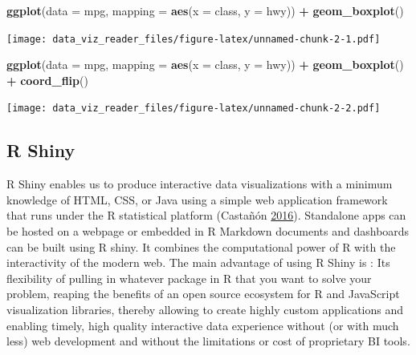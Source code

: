 \documentclass[]{book}
\newenvironment{Shaded}{\begin{snugshade}}{\end{snugshade}}
\newcommand{\DataTypeTok}[1]{\textcolor[rgb]{0.13,0.29,0.53}{#1}}
\newcommand{\KeywordTok}[1]{\textcolor[rgb]{0.13,0.29,0.53}{\textbf{#1}}}
\newcommand{\NormalTok}[1]{#1}
\newcommand{\OperatorTok}[1]{\textcolor[rgb]{0.81,0.36,0.00}{\textbf{#1}}}
\newcommand{\StringTok}[1]{\textcolor[rgb]{0.31,0.60,0.02}{#1}}
\begin{document}
\begin{Shaded}
\begin{Highlighting}[]
\KeywordTok{ggplot}\NormalTok{(}\DataTypeTok{data =}\NormalTok{ mpg, }\DataTypeTok{mapping =} \KeywordTok{aes}\NormalTok{(}\DataTypeTok{x =}\NormalTok{ class, }\DataTypeTok{y =}\NormalTok{ hwy)) }\OperatorTok{+}\StringTok{ }\KeywordTok{geom_boxplot}\NormalTok{()}
\end{Highlighting}
\end{Shaded}

\texttt{[image: data\_viz\_reader\_files/figure-latex/unnamed-chunk-2-1.pdf]}

\begin{Shaded}
\begin{Highlighting}[]
\KeywordTok{ggplot}\NormalTok{(}\DataTypeTok{data =}\NormalTok{ mpg, }\DataTypeTok{mapping =} \KeywordTok{aes}\NormalTok{(}\DataTypeTok{x =}\NormalTok{ class, }\DataTypeTok{y =}\NormalTok{ hwy)) }\OperatorTok{+}\StringTok{  }\KeywordTok{geom_boxplot}\NormalTok{() }\OperatorTok{+}\StringTok{  }
\StringTok{  }\KeywordTok{coord_flip}\NormalTok{()}
\end{Highlighting}
\end{Shaded}

\texttt{[image: data\_viz\_reader\_files/figure-latex/unnamed-chunk-2-2.pdf]}

\hypertarget{r-shiny}{%
\subsection{R Shiny}\label{r-shiny}}

R Shiny enables us to produce interactive data visualizations with a minimum knowledge of HTML, CSS, or Java using a simple web application framework that runs under the R statistical platform (Castañón \protect\hyperlink{ref-shiny_interactive_viz}{2016}). Standalone apps can be hosted on a webpage or embedded in R Markdown documents and dashboards can be built using R shiny. It combines the computational power of R with the interactivity of the modern web. The main advantage of using R Shiny is : Its flexibility of pulling in whatever package in R that you want to solve your problem, reaping the benefits of an open source ecosystem for R and JavaScript visualization libraries, thereby allowing to create highly custom applications and enabling timely, high quality interactive data experience without (or with much less) web development and without the limitations or cost of proprietary BI tools.
\end{document}
